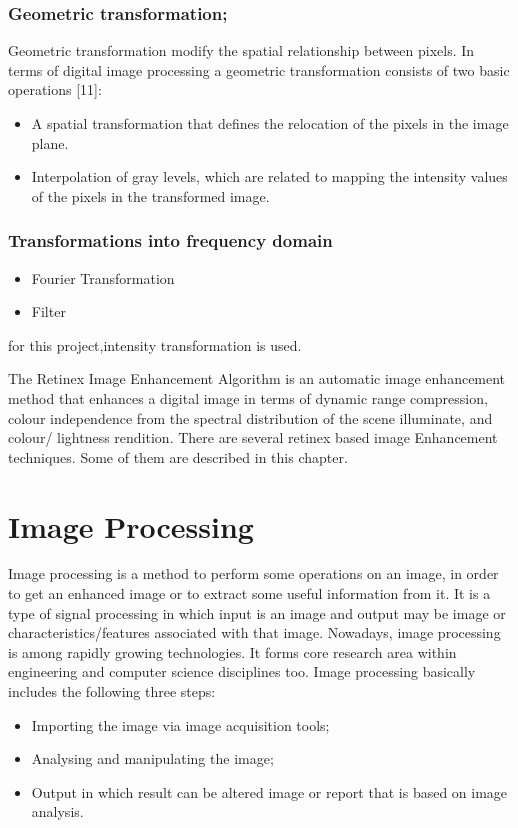 \subsubsection{Geometric transformation;}
Geometric transformation modify the spatial relationship between pixels. In terms of digital image processing a geometric transformation consists of two basic operations [11]:				

\begin{itemize}
	\item A spatial transformation that defines the relocation of the pixels in the image plane.
	\item Interpolation of gray levels, which are related to mapping the intensity values of the pixels in the transformed image.
\end{itemize}

\subsubsection{Transformations into frequency domain}
\begin{itemize}
	\item Fourier Transformation
	\item Filter
\end{itemize}
for this project,intensity transformation is used.













The Retinex Image Enhancement Algorithm is an automatic image enhancement method that enhances a digital image in terms of dynamic range compression, colour independence from the spectral distribution of the scene illuminate, and colour/ lightness rendition. There are several retinex based image Enhancement techniques. Some of them are described in this chapter.
\section{Image Processing}
Image processing is a method to perform some operations on an image, in order to get an enhanced image or to extract some useful information from it. It is a type of signal processing in which input is an image and output may be image or characteristics/features associated with that image. Nowadays, image processing is among rapidly growing technologies. It forms core research area within engineering and computer science disciplines too. Image processing basically includes the following three steps:
	\begin{itemize}
		\item Importing the image via image acquisition tools;
		\item Analysing and manipulating the image;
		\item Output in which result can be altered image or report that is based on image  		analysis.
	\end{itemize}
	
